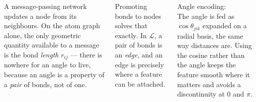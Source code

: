 \begin{frame}

\begin{columns}[T]
{\sffamily\footnotesize
A message-passing network updates a node from its neighbours. On the atom graph
alone, the only geometric quantity available to a message is the bond
\emph{length} $r_{ij}$ --- there is nowhere for an angle to live, because an
angle is a property of a \emph{pair} of bonds, not of one.

\vspace{4pt}
Promoting bonds to nodes solves that exactly. In $\mathcal{L}$, a pair of bonds
is an \emph{edge}, and an edge is precisely where a feature can be attached.}

\vspace{5pt}

{\sffamily\footnotesize\color{Muted} Angle encoding:}\\[3pt]
{\sffamily\footnotesize
The angle is fed as $\cos\theta_{jik}$ expanded on a radial basis, the same way
distances are. Using the cosine rather than the angle keeps the feature smooth
where it matters and avoids a discontinuity at $0$ and $\pi$.}

\vspace{6pt}
\end{columns}
\end{frame}

